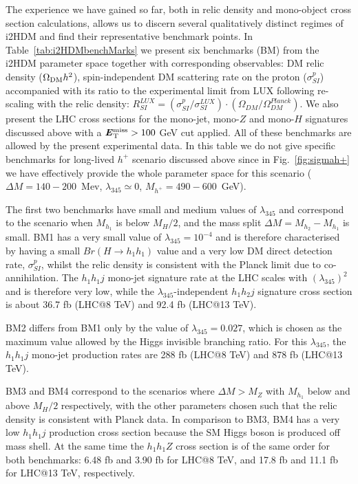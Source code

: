 \documentclass[12pt,a4paper]{article}
\newcommand {\blue} {\color{blue}}
\newcommand {\red} {\color{red}}
\newcommand{\MET}{\textbf{\textit{E}$_{\rm T}^{\rm miss}$}}
\begin{document}

The experience we have gained so far, both in relic density and mono-object cross section calculations,
allows us to discern several qualitatively distinct regimes
of i2HDM and find their representative benchmark points.
In Table~\ref{tab:i2HDMbenchMarks} we present six benchmarks (BM) from the i2HDM  parameter space
together with corresponding observables: DM relic density ($\Omega_{\rm DM} h^2$),
 spin-independent  DM scattering rate on the proton ($\sigma_{SI}^p$)
accompanied with its ratio to the experimental limit from LUX following re-scaling with the relic density: 
$R_{SI}^{LUX} =(\sigma_{SI}^p/\sigma_{SI}^{LUX})\cdot (\Omega_{DM}/\Omega_{DM}^{Planck})$.
We also present the LHC cross sections for the mono-jet, mono-$Z$ and mono-$H$ signatures
discussed above with a $\MET > 100$ GeV cut applied.
All of these benchmarks are allowed by the present experimental data.
{\blue
In this table we do not give specific benchmarks 
for long-lived $h^+$ scenario discussed above since in Fig.~\ref{fig:sigmah+}
we have effectively provide the whole parameter space for this scenario
($\Delta M = 140-200$~Mev, $\lambda_{345}\simeq 0$, $M_{h^+}=490-600$~GeV).
}

The first two benchmarks have small and medium values of $\lambda_{345}$ and correspond to the 
scenario when $M_{h_1}$ is below $M_H/2$, and the mass split $\Delta M = M_{h_2}-M_{h_1}$ is small.
BM1 has a very small value of  $\lambda_{345}=10^{-4}$ and is therefore characterised 
by having a small $Br(H\to h_1 h_1)$ value and a very low DM direct detection rate, $\sigma^p_{SI}$,
whilst the relic density is consistent with the Planck limit {due to co-annihilation}.
The $h_1h_1j$ mono-jet signature rate at the LHC scales with $(\lambda_{345})^2$ and is therefore very low,
while the $\lambda_{345}$-independent $h_1h_2j$ signature cross section 
is about 36.7 fb (LHC@8 TeV) and 92.4 fb (LHC@13 TeV).

BM2 differs from BM1 only by the value of $\lambda_{345}=0.027$, which is chosen as the maximum value 
allowed by the Higgs invisible branching ratio. For this $\lambda_{345}$,
the $h_1 h_1 j$ mono-jet production rates are 288 fb (LHC@8 TeV) and 878 fb (LHC@13 TeV).

BM3 and BM4 correspond to the scenarios where $\Delta M > M_Z$
with $M_{h_1}$ below and above $M_H/2$ respectively,
{with the other parameters chosen such that the} relic density is consistent with Planck data.
In comparison to BM3, BM4 has a very low $h_1h_1j$ production cross section because
the SM Higgs boson is produced off mass shell.
At the same time the $h_1 h_1 Z$ cross section 
is of the same order for both benchmarks: 6.48 fb and 3.90 fb for LHC@8 TeV,
and 17.8 fb and 11.1 fb for LHC@13 TeV, respectively.
\end{document}
